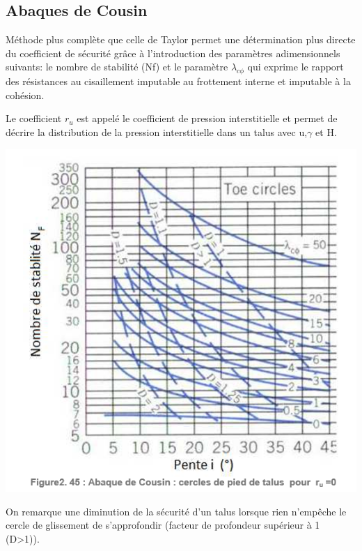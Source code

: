 \subsection{Abaques de Cousin}

Méthode plus complète que celle de Taylor permet une détermination plus directe du coefficient de sécurité grâce à l'introduction des paramètres adimensionnels suivants: le nombre de stabilité (Nf) et le paramètre $\lambda_{c\phi}$ qui exprime le rapport des résistances au cisaillement imputable au frottement interne et imputable à la cohésion.

Le coefficient $r_u$ est appelé le coefficient de pression interstitielle et permet de décrire la distribution de la pression interstitielle dans un talus avec u,$\gamma$ et H.

\begin{center}
\includegraphics [scale=0.8]{pictures/245.PNG}
\end{center}

On remarque une diminution de la sécurité d'un talus lorsque rien n'empêche le cercle de glissement de s'approfondir (facteur de profondeur supérieur à 1 (D>1)).
